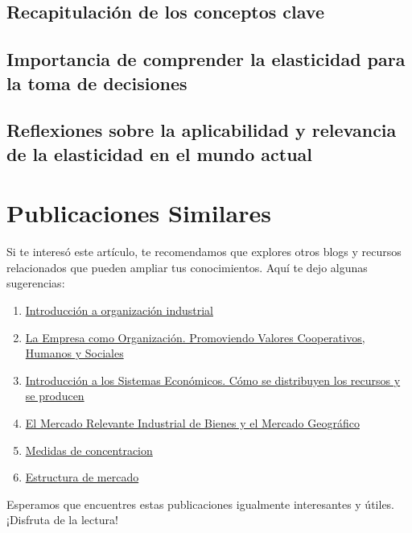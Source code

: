 \documentclass[
  a4paper,
]{article}
\begin{document}
\hypertarget{recapitulaciuxf3n-de-los-conceptos-clave}{%
\subsection{Recapitulación de los conceptos
clave}\label{recapitulaciuxf3n-de-los-conceptos-clave}}

\hypertarget{importancia-de-comprender-la-elasticidad-para-la-toma-de-decisiones}{%
\subsection{Importancia de comprender la elasticidad para la toma de
decisiones}\label{importancia-de-comprender-la-elasticidad-para-la-toma-de-decisiones}}

\hypertarget{reflexiones-sobre-la-aplicabilidad-y-relevancia-de-la-elasticidad-en-el-mundo-actual}{%
\subsection{Reflexiones sobre la aplicabilidad y relevancia de la
elasticidad en el mundo
actual}\label{reflexiones-sobre-la-aplicabilidad-y-relevancia-de-la-elasticidad-en-el-mundo-actual}}

\hypertarget{publicaciones-similares}{%
\section{Publicaciones Similares}\label{publicaciones-similares}}

Si te interesó este artículo, te recomendamos que explores otros blogs y
recursos relacionados que pueden ampliar tus conocimientos. Aquí te dejo
algunas sugerencias:

\begin{enumerate}
\def\labelenumi{\arabic{enumi}.}
\item
  \href{../2023-06-12-introducion-organizacion-industrial-oi-cap1/index.qmd}{Introducción
  a organización industrial}
\item
  \href{../2023-06-13-empresa-como-organizacion-oi-cap1/index.qmd}{La
  Empresa como Organización. Promoviendo Valores Cooperativos, Humanos y
  Sociales}
\item
  \href{../2023-06-13-sistemas-economicos-oi.cap1/index.qmd}{Introducción
  a los Sistemas Económicos. Cómo se distribuyen los recursos y se
  producen}
\item
  \href{../2023-06-15-mercado-relevante-oi-cap2/index.qmd}{El Mercado
  Relevante Industrial de Bienes y el Mercado Geográfico}
\item
  \href{../2023-06-16-concentracion-poder-oi-cap3/index.qmd}{Medidas de
  concentracion}
\item
  \href{../2023-06-17-estructura-mercado-oi-cap4/index.qmd}{Estructura
  de mercado}
\end{enumerate}

Esperamos que encuentres estas publicaciones igualmente interesantes y
útiles. ¡Disfruta de la lectura!


\printbibliography
\end{document}
